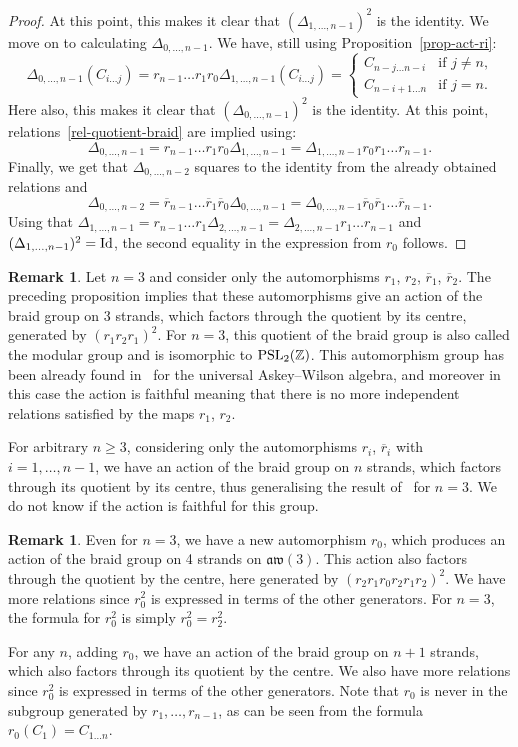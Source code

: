 \documentclass[10pt,a4paper]{amsart}
\numberwithin{equation}{section}
\theoremstyle{definition}
\newtheorem{rema}[theo]{Remark}
\newcommand{\rb}{\overline{r}}
\begin{document}
\begin{proof}
At this point, this makes it clear that $(\Delta_{1,\dots,n-1})^2$ is the identity. We move on to calculating $\Delta_{0,\dots,n-1}$. We have, still using Proposition~\ref{prop-act-ri}:
\[\Delta_{0,\dots,n-1} (C_{i\dots j})=r_{n-1}\dots r_1r_0\Delta_{1,\dots,n-1} (C_{i\dots j})=\begin{cases}
C_{n-j\dots n-i} & \text{if $j\neq n$,}\\
C_{n-i+1\dots n} & \text{if $j=n$.}
\end{cases}
\]
Here also, this makes it clear that $(\Delta_{0,\dots,n-1})^2$ is the identity. At this point, relations~\eqref{rel-quotient-braid} are implied using:
\[\Delta_{0,\dots,n-1}=r_{n-1}\dots r_{1}r_{0} \Delta_{1,\dots,n-1}= \Delta_{1,\dots,n-1}r_0r_1\dots r_{n-1} .\]
Finally, we get that $\Delta_{0,\dots,n-2}$ squares to the identity from the already obtained relations and
\[\Delta_{0,\dots,n-2}=\rb_{n-1}\dots \rb_{1}\rb_{0} \Delta_{0,\dots,n-1}= \Delta_{0,\dots,n-1}\rb_0\rb_1\dots \rb_{n-1} .\]
Using that $\Delta_{1,\dots,n-1}=r_{n-1}\dots r_{1} \Delta_{2,\dots,n-1}= \Delta_{2,\dots,n-1}r_1\dots r_{n-1}$ and $(\Delta_{1,\dots,n-1})^2={\rm Id}$, the second equality in the expression from $r_0$ follows.
\end{proof}

\begin{rema}
Let $n=3$ and consider only the automorphisms $r_1$, $r_2$, $\rb_1$, $\rb_2$. The preceding proposition implies that these automorphisms give an action of the braid group on 3 strands,
which factors through the quotient by its centre, generated by $(r_1r_2r_1)^2$.
For $n=3$, this quotient of the braid group is also called the modular group and is isomorphic to ${\rm PSL}_2(\mathbb{Z})$. This automorphism group has been already found in~\cite{Ter} for the universal Askey--Wilson algebra,
and moreover in this case the action is faithful meaning that there is no more independent relations satisfied by the maps $r_1$, $r_2$.

For arbitrary $n\geq 3$, considering only the automorphisms $r_i$, $\rb_i$ with $i=1,\dots,n-1$, we have an action of the braid group on $n$ strands, which factors through its quotient by its centre,
thus generalising the result of~\cite{Ter} for $n=3$. We do not know if the action is faithful for this group.
\end{rema}

\begin{rema}
Even for $n=3$, we have a new automorphism $r_0$, which produces an action of the braid group on 4 strands on $\mathfrak{aw}(3)$.
This action also factors through the quotient by the centre, here generated by $(r_2r_1r_0r_2r_1r_2)^2$.
We have more relations since $r_0^2$ is expressed in terms of the other generators. For $n=3$, the formula for $r_0^2$ is simply $r_0^2=r_2^2$.

For any $n$, adding $r_0$, we have an action of the braid group on $n+1$ strands, which also factors through its quotient by the centre. We also have more relations since $r_0^2$ is expressed in terms of the other generators. Note that $r_0$ is never in the subgroup generated by $r_1,\dots,r_{n-1}$, as can be seen from the formula $r_0(C_1)=C_{1\dots n}$.
\end{rema}
\end{document}
